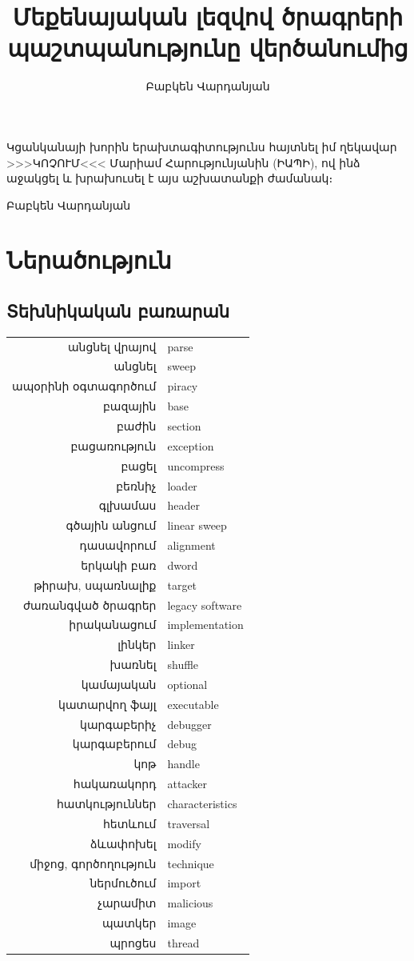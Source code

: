 \documentclass[12pt]{article}
\author{Բաբկեն Վարդանյան}
\title{Մեքենայական լեզվով ծրագրերի պաշտպանությունը վերծանումից}
\begin{document}
\setcounter{page}{1}

\maketitle
\newpage

Կցանկանայի խորին երախտագիտությունս հայտնել իմ ղեկավար >>>ԿՈՉՈՒՄ<<<
Մարիամ Հարությունյանին (ԻԱՊԻ), ով ինձ աջակցել և խրախուսել է այս աշխատանքի
ժամանակ։

\hfill \hfill Բաբկեն Վարդանյան

\newpage

\tableofcontents

\begin{sloppypar}
\section{Ներածություն}
\subsection{Տեխնիկական բառարան}

\begin{tabular}{rl}
անցնել վրայով&parse \\
անցնել&sweep \\
ապօրինի օգտագործում&piracy \\
բազային&base \\
բաժին&section \\
բացառություն&exception \\
բացել&uncompress \\
բեռնիչ&loader \\
գլխամաս&header \\
գծային անցում&linear sweep \\
դասավորում&alignment \\
երկակի բառ&dword \\
թիրախ, սպառնալիք&target \\
ժառանգված ծրագրեր&legacy software \\
իրականացում&implementation \\
լինկեր&linker \\
խառնել&shuffle \\
կամայական&optional \\
կատարվող ֆայլ&executable \\
կարգաբերիչ&debugger \\
կարգաբերում&debug \\
կոթ&handle \\
հակառակորդ&attacker \\
հատկություններ&characteristics \\
հետևում&traversal \\
ձևափոխել&modify \\
միջոց, գործողություն&technique \\
ներմուծում&import \\
չարամիտ&malicious \\
պատկեր&image \\
պրոցես&thread \\
\end{tabular}


\end{sloppypar}
\end{document}
